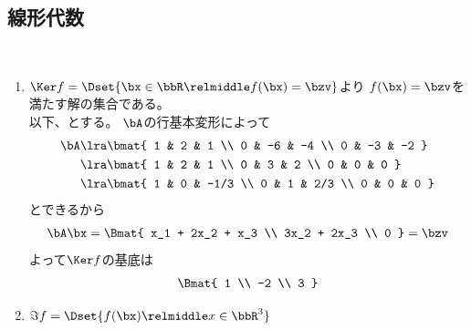 \subsection{線形代数}
\begin{ans*}
  ${}$
  \begin{enumerate}[label=(\arabic*)]
    \item $\Ker f=\Dset{\bx\in \bbR\relmiddle f(\bx) = \bzv}$より
    $f(\bx)=\bzv$を満たす解の集合である。\\以下、とする。
    $\bA$の行基本変形によって
    \begin{align}
      \bA
      &\lra \bmat{
        1 & 2 & 1 \\
        0 & -6 & -4 \\
        0 & -3 & -2
      } \\
      &\lra \bmat{
        1 & 2 & 1 \\
        0 & 3 & 2 \\
        0 & 0 & 0
      } \\
      &\lra \bmat{
        1 & 0 & -1/3 \\
        0 & 1 & 2/3 \\
        0 & 0 & 0
      }
    \end{align}
    とできるから
    \begin{gather}
      \bA\bx =
      \Bmat{
        x_1 + 2x_2 + x_3 \\
        3x_2 + 2x_3 \\
        0
      }=\bzv
    \end{gather}
    よって$\Ker f$の基底は
    \begin{gather}
      \Bmat{
        1 \\ -2 \\ 3
      }
    \end{gather}
    \item $\Im f =\Dset{f(\bx)\relmiddle x\in\bbR^3}$

\end{enumerate}
\end{ans*}
